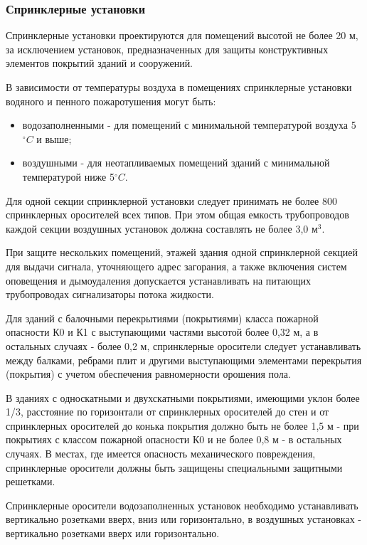 \subsubsection*{Спринклерные установки}

Спринклерные установки проектируются для помещений высотой не более 20 м, за исключением установок, предназначенных для защиты
конструктивных элементов покрытий зданий и сооружений.

В зависимости от температуры воздуха в помещениях спринклерные установки водяного и пенного пожаротушения могут быть:
\begin{itemize}
\item водозаполненными - для помещений с минимальной температурой воздуха 5${^\circ{C}}$ и выше;
\item воздушными - для неотапливаемых помещений зданий с минимальной температурой ниже 5${^\circ{C}}$.
\end{itemize}
 
Для одной секции спринклерной установки следует принимать не более 800 спринклерных оросителей всех типов.
При этом общая емкость трубопроводов каждой секции воздушных установок должна составлять не более 3,0 м$^3$.

При защите нескольких помещений, этажей здания одной спринклерной секцией для выдачи сигнала, уточняющего адрес загорания, а также
включения систем оповещения и дымоудаления допускается устанавливать на питающих трубопроводах сигнализаторы потока жидкости.
 
Для зданий с балочными перекрытиями (покрытиями) класса пожарной опасности К0 и К1 с выступающими частями высотой более 0,32 м, а
в остальных случаях - более 0,2 м, спринклерные оросители следует устанавливать между балками, ребрами плит и другими выступающими
элементами перекрытия (покрытия) с учетом обеспечения равномерности орошения пола.
 
В зданиях с односкатными и двухскатными покрытиями, имеющими уклон более 1/3, расстояние по горизонтали от спринклерных оросителей
до стен и от спринклерных оросителей до конька покрытия должно быть не более 1,5 м - при покрытиях с классом пожарной опасности
К0 и не более 0,8 м - в остальных случаях. В местах, где имеется опасность механического повреждения, спринклерные оросители
должны быть защищены специальными защитными решетками.
 
Спринклерные оросители водозаполненных установок необходимо устанавливать вертикально розетками вверх, вниз или горизонтально,
в воздушных установках - вертикально розетками вверх или горизонтально.

